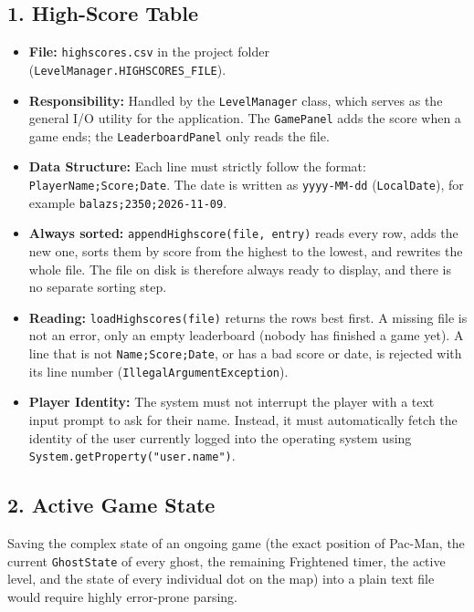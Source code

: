 \documentclass[11pt, a4paper]{article}
\begin{document}
\subsection*{1. High-Score Table}
\begin{itemize}
    \item \textbf{File:} \texttt{highscores.csv} in the project folder (\texttt{LevelManager.HIGHSCORES\_FILE}).
    \item \textbf{Responsibility:} Handled by the \texttt{LevelManager} class, which serves as the general I/O utility for the application. The \texttt{GamePanel} adds the score when a game ends; the \texttt{LeaderboardPanel} only reads the file.
    \item \textbf{Data Structure:} Each line must strictly follow the format: \texttt{PlayerName;Score;Date}. The date is written as \texttt{yyyy-MM-dd} (\texttt{LocalDate}), for example \texttt{balazs;2350;2026-11-09}.
    \item \textbf{Always sorted:} \texttt{appendHighscore(file, entry)} reads every row, adds the new one, sorts them by score from the highest to the lowest, and rewrites the whole file. The file on disk is therefore always ready to display, and there is no separate sorting step.
    \item \textbf{Reading:} \texttt{loadHighscores(file)} returns the rows best first. A missing file is not an error, only an empty leaderboard (nobody has finished a game yet). A line that is not \texttt{Name;Score;Date}, or has a bad score or date, is rejected with its line number (\texttt{IllegalArgumentException}).
    \item \textbf{Player Identity:} The system must not interrupt the player with a text input prompt to ask for their name. Instead, it must automatically fetch the identity of the user currently logged into the operating system using \texttt{System.getProperty("user.name")}.
\end{itemize}

\subsection*{2. Active Game State}
Saving the complex state of an ongoing game (the exact position of Pac-Man, the current \texttt{GhostState} of every ghost, the remaining Frightened timer, the active level, and the state of every individual dot on the map) into a plain text file would require highly error-prone parsing. 
\end{document}
